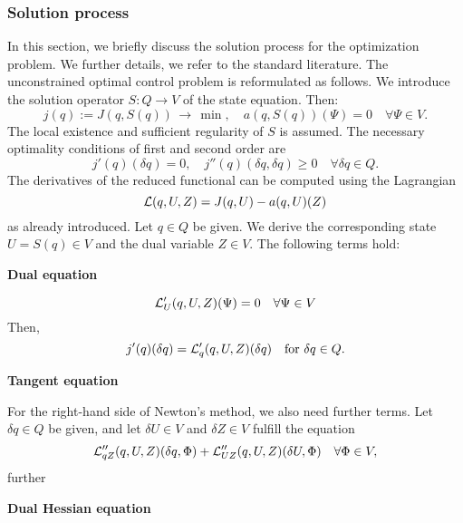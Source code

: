 {\subsubsection{Solution process}
In this section, we briefly discuss the solution process for the 
optimization problem. We further details, we refer to the standard literature.
The unconstrained optimal control problem is reformulated as follows. 
We introduce the solution operator $S:Q\rightarrow V$ of the state equation.
Then:
\begin{equation*}
j(q):= J(q,S(q))\, \rightarrow \, \min , \quad a(q,S(q))(\Psi) = 0 \quad 
\forall \Psi \in V.
\end{equation*}
The local existence and sufficient regularity of $S$ is assumed. The 
necessary optimality conditions of first and second order are
\begin{equation*}
j'(q)(\delta q) = 0 , \quad j''(q)(\delta q,\delta q) \geq 0 \quad 
\forall\delta q\in Q.
\end{equation*} 
The derivatives of the reduced functional can be computed using the 
Lagrangian
\begin{equation*}
{\cal L}(q,U,Z) =J(q,U) - a(q,U)(Z)
\end{equation*}
as already introduced. Let $q\in Q$ be given. We derive
 the corresponding state $U=S(q)\in V$ and the dual variable
$Z\in V$. The following terms hold:
}


\textbf{Dual equation}

\begin{equation*}
{\cal L}_U'(q,U,Z)(\Psi) = 0 \quad\forall\Psi\in V
\end{equation*}
Then,
\begin{equation*}
j'(q)(\delta q) = {\cal L}_q' (q,U,Z)(\delta q) \quad \text{for }\delta q\in Q.
\end{equation*}

\textbf{Tangent equation}

For the right-hand side of Newton's method, we also need further terms. Let
$\delta q\in Q$ be given, and let $\delta U\in V$ and $\delta Z\in V$ fulfill
the equation
\begin{equation*}
{\cal L}_{qZ}'' (q,U,Z)(\delta q,\Phi) + {\cal L}_{UZ}'' (q,U,Z)(\delta
U,\Phi)
\quad\forall \Phi\in V,
\end{equation*}
further 

\textbf{Dual Hessian equation}

